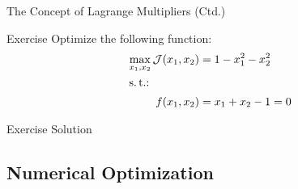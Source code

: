\begin{frame}{The Concept of Lagrange Multipliers (Ctd.)}{}\important
\end{frame}


\begin{frame}{Exercise}{}
	Optimize the following function:
	\begin{align*}
		\max_{x_1, x_2} \mathcal{J}(x_1, x_2)
			&= 1 - x_1^2 - x_2^2 		\\
		\intertext{s.\,t.:}
		f(x_1, x_2)
			&= x_1 + x_2 - 1 = 0
		\end{align*}
\end{frame}


\begin{frame}{Exercise Solution}{}
	
\end{frame}


\subsection{Numerical Optimization}

